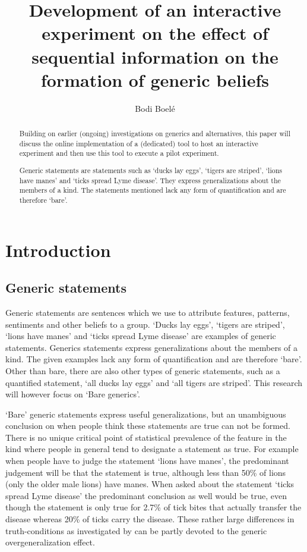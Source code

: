 \documentclass[twoside]{uva-inf-bachelor-thesis}
\title{Development of an interactive experiment on the effect of sequential information on the formation of generic beliefs}
\author{Bodi Boelé}
\theoremstyle{definition}
\begin{document}
\maketitle

\begin{abstract}
Building on earlier (ongoing) investigations on generics and alternatives, this paper will discuss the online implementation of a (dedicated) tool to host an interactive experiment and then use this tool to execute a pilot experiment.

Generic statements are statements such as `ducks lay eggs', `tigers are striped', `lions have manes' and `ticks spread Lyme disease'. They express generalizations about the members of a kind. The statements mentioned lack any form of quantification and are therefore `bare'. 
\end{abstract}

\tableofcontents

\chapter{Introduction}
\section{Generic statements}
Generic statements are sentences which we use to attribute features, patterns, sentiments and other beliefs to a group.
`Ducks lay eggs', `tigers are striped', `lions have manes' and `ticks spread Lyme disease' are examples of generic statements. Generics statements express generalizations about the members of a kind. The given examples lack any form of quantification and are therefore `bare'. Other than bare, there are also other types of generic statements, such as a quantified statement, `all ducks lay eggs' and `all tigers are striped'. This research will however focus on `Bare generics'.

`Bare' generic statements express useful generalizations, but an unambiguous conclusion on when people think these statements are true can not be formed. There is no unique critical point of statistical prevalence of the feature in the kind where people in general tend to designate a statement as true. For example when people have to judge the statement `lions have manes', the predominant judgement will be that the statement is true, although less than 50\% of lions (only the older male lions) have manes. When asked about the statement `ticks spread Lyme disease' the predominant conclusion as well would be true, even though the statement is only true for 2.7\% \parencite{rivm_2019} of tick bites that actually transfer the disease whereas 20\% of ticks carry the disease. These rather large differences in truth-conditions as investigated by \cite{leslie2011all} can be partly devoted to the generic overgeneralization effect.
\end{document}
